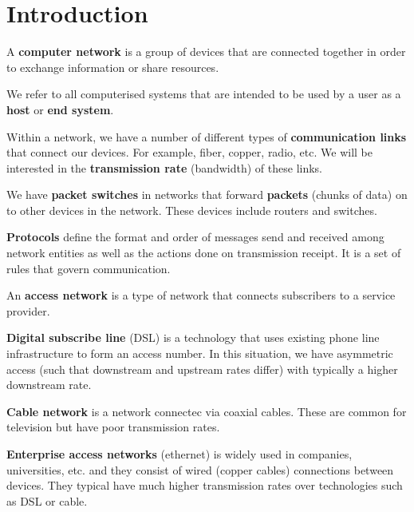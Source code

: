 \chapter{Introduction}

\begin{definition}
    A \textbf{computer network} is a group of devices that are connected together in order to exchange information or share resources.
\end{definition}

We refer to all computerised systems that are intended to be used by a user as a \textbf{host} or \textbf{end system}.

Within a network, we have a number of different types of \textbf{communication links} that connect our devices. For example, fiber, copper, radio, etc. We will be interested in the \textbf{transmission rate} (bandwidth) of these links.

We have \textbf{packet switches} in networks that forward \textbf{packets} (chunks of data) on to other devices in the network. These devices include routers and switches.

\begin{definition}[Protocol]
    \textbf{Protocols} define the format and order of messages send and received among network entities as well as the actions done on transmission receipt. It is a set of rules that govern communication.
\end{definition}

\begin{definition}
    An \textbf{access network} is a type of network that connects subscribers to a service provider.
\end{definition}

\textbf{Digital subscribe line} (DSL) is a technology that uses existing phone line infrastructure to form an access number. In this situation, we have asymmetric access (such that downstream and upstream rates differ) with typically a higher downstream rate.

\textbf{Cable network} is a network connectec via coaxial cables. These are common for television but have poor transmission rates.

\textbf{Enterprise access networks} (ethernet) is widely used in companies, universities, etc. and they consist of wired (copper cables) connections between devices. They typical have much higher transmission rates over technologies such as DSL or cable.

